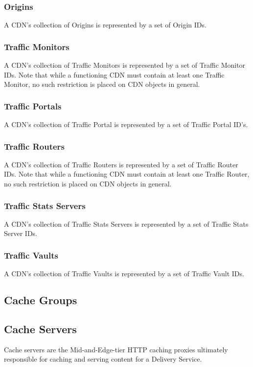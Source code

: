 \subsubsection{Origins}
A CDN's collection of Origins is represented by a set of Origin IDs.

\subsubsection{Traffic Monitors}
A CDN's collection of Traffic Monitors is represented by a set of Traffic Monitor
IDs. Note that while a functioning CDN must contain at least one Traffic Monitor,
no such restriction is placed on CDN objects in general.

\subsubsection{Traffic Portals}
A CDN's collection of Traffic Portal is represented by a set of Traffic Portal
ID's.

\subsubsection{Traffic Routers}
A CDN's collection of Traffic Routers is represented by a set of Traffic Router
IDs. Note that while a functioning CDN must contain at least one Traffic Router,
no such restriction is placed on CDN objects in general.

\subsubsection{Traffic Stats Servers}
A CDN's collection of Traffic Stats Servers is represented by a set of Traffic
Stats Server IDs.

\subsubsection{Traffic Vaults}
A CDN's collection of Traffic Vaults is represented by a set of Traffic Vault IDs.



\subsection{Cache Groups}



\subsection{Cache Servers}
Cache servers are the Mid-and-Edge-tier HTTP caching proxies ultimately
responsible for caching and serving content for a Delivery Service.

